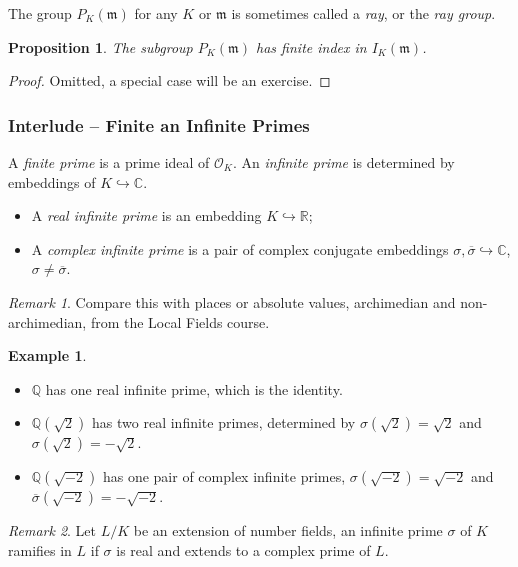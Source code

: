 \documentclass[11pt]{article}
\theoremstyle{definition}
\newtheorem*{example*}{Example}
\theoremstyle{plain}
\newtheorem{proposition}[definition]{Proposition}
\theoremstyle{remark}
\newtheorem*{remark*}{Remark}
\newcommand{\QQ}{\mathbb{Q}}
\newcommand{\RR}{\mathbb{R}}
\newcommand{\CC}{\mathbb{C}}
\newcommand{\cO}{\mathcal{O}}
\newcommand{\fm}{\mathfrak{m}}
\begin{document}
The group $P_K(\fm)$ for any $K$ or $\fm$ is sometimes called a \emph{ray}, or the \emph{ray group}.

\begin{proposition}\label{prop:2_16}
    The subgroup $P_K(\fm)$ has finite index in $I_K(\fm)$.
\end{proposition}
\begin{proof}
    Omitted, a special case will be an exercise.
\end{proof}

\subsubsection*{Interlude -- Finite an Infinite Primes}
A \emph{finite prime} is a prime ideal of $\cO_K$. An \emph{infinite prime} is determined by embeddings of $K \hookrightarrow \CC$.
\begin{itemize}
    \item A \emph{real infinite prime} is an embedding $K \hookrightarrow \RR$;
    \item A \emph{complex infinite prime} is a pair of complex conjugate embeddings $\sigma, \overline{\sigma} \hookrightarrow \CC$, $\sigma \neq \overline{\sigma}$.
\end{itemize}

\begin{remark*}
    Compare this with places or absolute values, archimedian and non-archimedian, from the Local Fields course.
\end{remark*}

\begin{example*}\phantom{}
    \begin{itemize}
        \item $\QQ$ has one real infinite prime, which is the identity.
        \item $\QQ(\sqrt{2})$ has two real infinite primes, determined by $\sigma(\sqrt{2}) = \sqrt{2}$ and $\sigma(\sqrt{2}) = -\sqrt{2}$.
        \item $\QQ(\sqrt{-2})$ has one pair of complex infinite primes, $\sigma(\sqrt{-2}) = \sqrt{-2}$ and $\overline{\sigma}(\sqrt{-2}) = -\sqrt{-2}$.
    \end{itemize}
\end{example*}

\begin{remark*}
    Let $L/K$ be an extension of number fields, an infinite prime $\sigma$ of $K$ ramifies in $L$ if $\sigma$ is real and extends to a complex prime of $L$.
\end{remark*}
\end{document}

